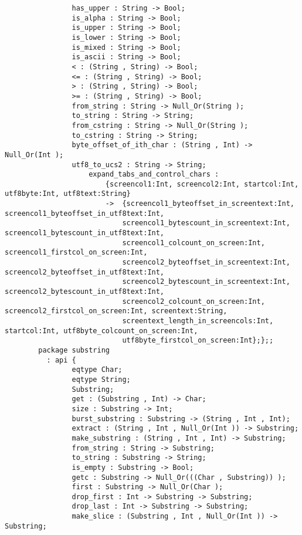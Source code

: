 \begin{verbatim}
                has_upper : String -> Bool;
                is_alpha : String -> Bool;
                is_upper : String -> Bool;
                is_lower : String -> Bool;
                is_mixed : String -> Bool;
                is_ascii : String -> Bool;
                < : (String , String) -> Bool;
                <= : (String , String) -> Bool;
                > : (String , String) -> Bool;
                >= : (String , String) -> Bool;
                from_string : String -> Null_Or(String );
                to_string : String -> String;
                from_cstring : String -> Null_Or(String );
                to_cstring : String -> String;
                byte_offset_of_ith_char : (String , Int) -> Null_Or(Int );
                utf8_to_ucs2 : String -> String;
                    expand_tabs_and_control_chars :
                        {screencol1:Int, screencol2:Int, startcol:Int, utf8byte:Int, utf8text:String}
                        ->  {screencol1_byteoffset_in_screentext:Int, screencol1_byteoffset_in_utf8text:Int,
                            screencol1_bytescount_in_screentext:Int, screencol1_bytescount_in_utf8text:Int,
                            screencol1_colcount_on_screen:Int, screencol1_firstcol_on_screen:Int,
                            screencol2_byteoffset_in_screentext:Int, screencol2_byteoffset_in_utf8text:Int,
                            screencol2_bytescount_in_screentext:Int, screencol2_bytescount_in_utf8text:Int,
                            screencol2_colcount_on_screen:Int, screencol2_firstcol_on_screen:Int, screentext:String,
                            screentext_length_in_screencols:Int, startcol:Int, utf8byte_colcount_on_screen:Int,
                            utf8byte_firstcol_on_screen:Int};};;
        package substring
          : api {
                eqtype Char;
                eqtype String;
                Substring;
                get : (Substring , Int) -> Char;
                size : Substring -> Int;
                burst_substring : Substring -> (String , Int , Int);
                extract : (String , Int , Null_Or(Int )) -> Substring;
                make_substring : (String , Int , Int) -> Substring;
                from_string : String -> Substring;
                to_string : Substring -> String;
                is_empty : Substring -> Bool;
                getc : Substring -> Null_Or(((Char , Substring)) );
                first : Substring -> Null_Or(Char );
                drop_first : Int -> Substring -> Substring;
                drop_last : Int -> Substring -> Substring;
                make_slice : (Substring , Int , Null_Or(Int )) -> Substring;

\end{verbatim}

